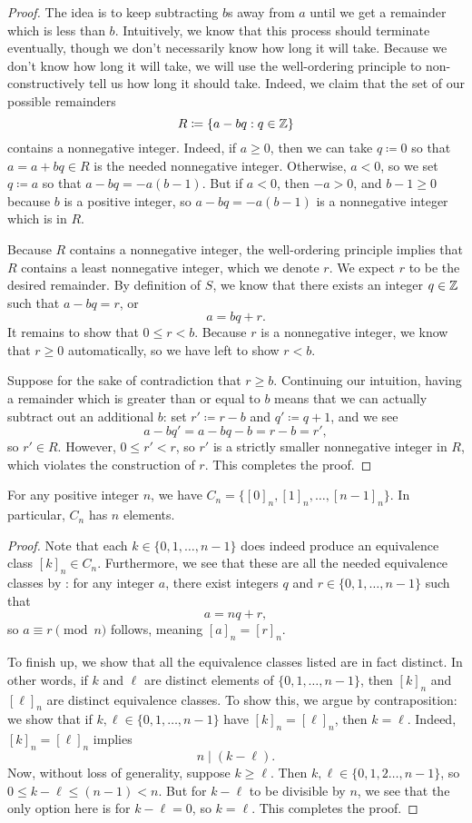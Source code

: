 \documentclass[../notes.tex]{subfiles}
\begin{document}
\begin{proof}
    The idea is to keep subtracting $b$s away from $a$ until we get a remainder which is less than $b$. Intuitively, we know that this process should terminate eventually, though we don't necessarily know how long it will take. Because we don't know how long it will take, we will use the well-ordering principle to non-constructively tell us how long it should take. Indeed, we claim that the set of our possible remainders
    \[R\coloneqq\{a-bq:q\in\mathbb Z\}\]
    contains a nonnegative integer. Indeed, if $a\ge0$, then we can take $q\coloneqq0$ so that $a=a+bq\in R$ is the needed nonnegative integer. Otherwise, $a<0$, so we set $q\coloneqq a$ so that $a-bq=-a(b-1)$. But if $a<0$, then $-a>0$, and $b-1\ge0$ because $b$ is a positive integer, so $a-bq=-a(b-1)$ is a nonnegative integer which is in $R$.
    
    Because $R$ contains a nonnegative integer, the well-ordering principle implies that $R$ contains a least nonnegative integer, which we denote $r$. We expect $r$ to be the desired remainder. By definition of $S$, we know that there exists an integer $q\in\mathbb Z$ such that $a-bq=r$, or
    \[a=bq+r.\]
    It remains to show that $0\le r<b$. Because $r$ is a nonnegative integer, we know that $r\ge0$ automatically, so we have left to show $r<b$.
    
    Suppose for the sake of contradiction that $r\ge b$. Continuing our intuition, having a remainder which is greater than or equal to $b$ means that we can actually subtract out an additional $b$: set $r'\coloneqq r-b$ and $q'\coloneqq q+1$, and we see
    \[a-bq'=a-bq-b=r-b=r',\]
    so $r'\in R$. However, $0\le r'<r$, so $r'$ is a strictly smaller nonnegative integer in $R$, which violates the construction of $r$. This completes the proof.
\end{proof}
\begin{corollary}
    For any positive integer $n$, we have $C_n=\{[0]_n,[1]_n,\ldots,[n-1]_n\}$. In particular, $C_n$ has $n$ elements.
\end{corollary}
\begin{proof}
    Note that each $k\in\{0,1,\ldots,n-1\}$ does indeed produce an equivalence class $[k]_n\in C_n$. Furthermore, we see that these are all the needed equivalence classes by : for any integer $a$, there exist integers $q$ and $r\in\{0,1,\ldots,n-1\}$ such that
    \[a=nq+r,\]
    so $a\equiv r\pmod n$ follows, meaning $[a]_n=[r]_n$.
    
    To finish up, we show that all the equivalence classes listed are in fact distinct. In other words, if $k$ and $\ell$ are distinct elements of $\{0,1,\ldots,n-1\}$, then $[k]_n$ and $[\ell]_n$ are distinct equivalence classes. To show this, we argue by contraposition: we show that if $k,\ell\in\{0,1,\ldots,n-1\}$ have $[k]_n=[\ell]_n$, then $k=\ell$. Indeed, $[k]_n=[\ell]_n$ implies
    \[n\mid(k-\ell).\]
    Now, without loss of generality, suppose $k\ge\ell$. Then $k,\ell\in\{0,1,2\ldots,n-1\}$, so $0\le k-\ell\le(n-1)<n$. But for $k-\ell$ to be divisible by $n$, we see that the only option here is for $k-\ell=0$, so $k=\ell$. This completes the proof.
\end{proof}
\end{document}
